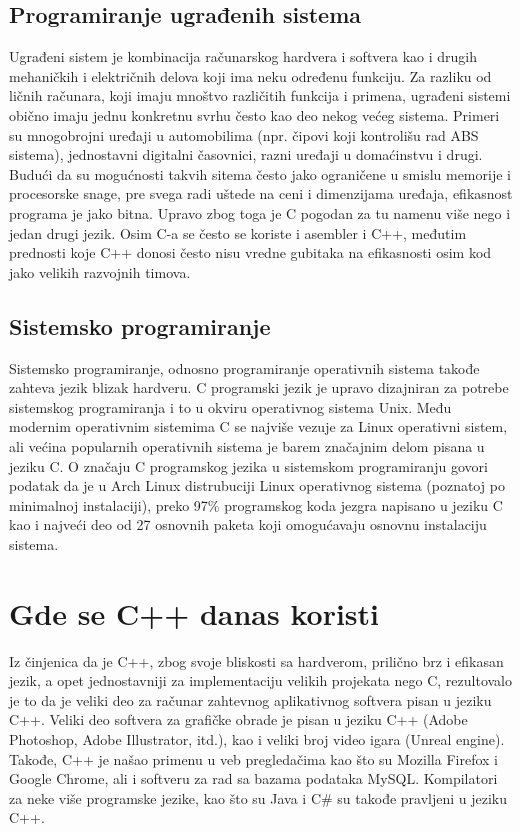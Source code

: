 \documentclass[a4paper]{article}
\begin{document}
\subsection{Programiranje ugrađenih sistema}
Ugrađeni sistem je kombinacija računarskog hardvera i softvera kao i drugih mehaničkih i električnih
delova koji ima neku određenu funkciju. Za razliku od ličnih računara, koji imaju mnoštvo različitih funkcija i primena, ugrađeni sistemi obično imaju jednu konkretnu svrhu često kao deo nekog većeg sistema. Primeri su mnogobrojni uređaji u automobilima (npr. čipovi koji kontrolišu rad ABS sistema), jednostavni digitalni časovnici, razni uređaji u  domaćinstvu i drugi. Budući da su mogućnosti takvih sitema često jako ograničene u smislu memorije i procesorske snage, pre svega radi uštede na ceni i dimenzijama uređaja, efikasnost programa je jako bitna. Upravo zbog toga je C pogodan za tu namenu više nego i jedan drugi jezik. Osim C-a se često se koriste i asembler i C++, međutim prednosti koje C++ donosi često nisu vredne gubitaka na efikasnosti osim kod jako velikih razvojnih timova\cite{Programming Embedded Systems}.

\subsection{Sistemsko programiranje}Sistemsko programiranje, odnosno programiranje operativnih sistema takođe zahteva jezik blizak hardveru. C programski jezik je upravo dizajniran za potrebe sistemskog programiranja i to u okviru operativnog sistema Unix. Među modernim operativnim sistemima C se najviše vezuje za Linux operativni sistem, ali većina popularnih operativnih sistema je barem značajnim delom pisana u jeziku C. O značaju C programskog jezika u sistemskom programiranju govori podatak da je u Arch Linux distrubuciji Linux operativnog sistema (poznatoj po minimalnoj instalaciji), preko 97\% programskog koda jezgra napisano u jeziku C kao i najveći deo od 27 osnovnih paketa koji omogućavaju osnovnu instalaciju sistema\cite{relevanceofc}.

\section{Gde se C++ danas koristi}

Iz činjenica da je C++, zbog svoje bliskosti sa hardverom, prilično brz i efikasan jezik, a opet jednostavniji za implementaciju velikih projekata nego C, rezultovalo je to da je veliki deo za računar zahtevnog aplikativnog softvera pisan u jeziku C++. Veliki deo softvera za grafičke obrade je pisan u jeziku C++ (Adobe Photoshop, Adobe Illustrator, itd.), kao i veliki broj video igara (Unreal engine). Takođe, C++ je našao primenu u veb pregledačima kao što su Mozilla Firefox i Google Chrome, ali i softveru za rad sa bazama podataka MySQL. Kompilatori za neke više programske jezike, kao što su Java i C\# su takođe pravljeni u jeziku C++.
\end{document}
